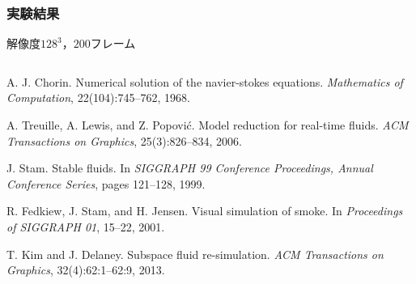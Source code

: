 \documentclass[aspectratio=169,dvipdfmx,hyperref={bookmarks=true}]{beamer}
\begin{document}
 \begin{frame}
 \frametitle{実験結果}
\begin{block}{}
解像度$128^3$，$200$フレーム
\end{block}
\begin{columns}
    \begin{column}{0.33\textwidth}
    \end{column}
    \begin{column}{0.33\textwidth}
    \end{column}
    \begin{column}{0.33\textwidth}
    \end{column}
\end{columns}
\end{frame}
\begin{thebibliography}{99}
\beamertemplatetextbibitems

A. J. Chorin. Numerical solution of the navier-stokes equations. \textit{Mathematics of Computation}, 22(104):745--762, 1968.

A. Treuille, A. Lewis, and Z. Popovi\'{c}. Model reduction for real-time fluids. \textit{ACM Transactions on Graphics}, 25(3):826--834, 2006.

J. Stam. Stable fluids. In \textit{SIGGRAPH 99 Conference Proceedings, Annual Conference Series}, pages 121--128, 1999.

R. Fedkiew, J. Stam, and H. Jensen. Visual simulation of smoke. In \textit{Proceedings of SIGGRAPH 01}, 15--22, 2001.

T. Kim and J. Delaney. Subspace fluid re-simulation. \textit{ACM Transactions on Graphics}, 32(4):62:1--62:9, 2013.


\end{thebibliography}
\end{document}

